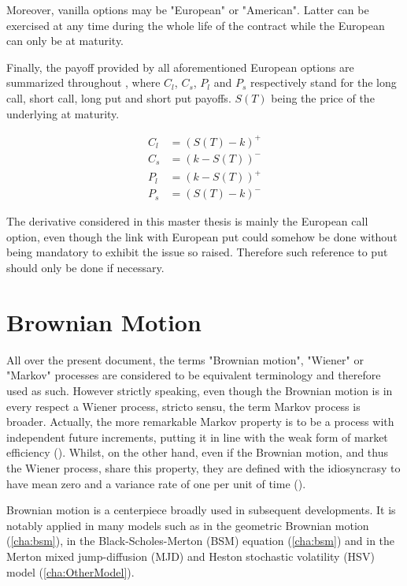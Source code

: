 \documentclass[12pt,a4paper]{report}
\begin{document}
Moreover, vanilla options may be "European" or "American". Latter can be exercised at any time during the whole life of the contract while the European can only be at maturity.

Finally, the payoff provided by all aforementioned European options are summarized throughout , where $C_l$, $C_s$, $P_l$ and $P_s$ respectively stand for the long call, short call, long put and short put payoffs. $S(T)$ being the price of the underlying at maturity.

\begin{align}
C_l &= \left(S(T) - k\right)^+ \label{eq:upstream:cl}\\
C_s &= \left(k - S(T)\right)^- \label{eq:upstream:cs}\\
P_l &= \left(k - S(T)\right)^+ \label{eq:upstream:pl}\\
P_s &= \left(S(T) - k\right)^- \label{eq:upstream:ps}
\end{align}

The derivative considered in this master thesis is mainly the European call option, even though the link with European put could somehow be done without being mandatory to exhibit the issue so raised. Therefore such reference to put should only be done if necessary.

\section{Brownian Motion}
\label{sec:upstream:brownian}
 
All over the present document, the terms "Brownian motion", "Wiener" or "Markov" processes are considered to be equivalent terminology and therefore used as such. However strictly speaking, even though the Brownian motion is in every respect a Wiener process, stricto sensu, the term Markov process is broader. 
Actually, the more remarkable Markov property is to be a process with independent future increments, putting it in line with the weak form of market efficiency (\citet{hull}).
Whilst, on the other hand, even if the Brownian motion, and thus the Wiener process, share this property, they are defined with the idiosyncrasy to have mean zero and a variance rate of one per unit of time (\citet{hull}).

Brownian motion is a centerpiece broadly used in subsequent developments. It is notably applied in many models such as in the geometric Brownian motion (\cref{cha:bsm}),  in the Black-Scholes-Merton (BSM) equation (\cref{cha:bsm}) and in the Merton mixed jump-diffusion (MJD) and Heston stochastic volatility (HSV) model (\cref{cha:OtherModel}).
\end{document}
